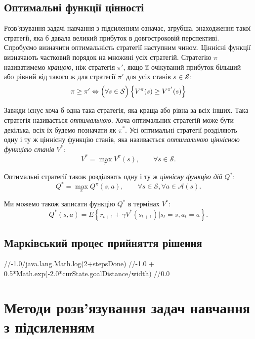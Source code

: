 \subsection{Оптимальні функції цінності}

Розв'язування задачі навчання з підсиленням означає, згрубша, знаходження такої стратегії, яка б давала великий прибуток в довгостроковій перспективі. Спробуємо визначити оптимальність стратегії наступним чином. Ціннісні функції визначають частковий порядок на множині усіх стратегій. Стратегію $\pi$ називатимемо \emph{кращою}, ніж стратегія $\pi '$, якщо її очікуваний прибуток більший або рівний від такого ж для стратегії $\pi '$ для усіх станів $s \in \mathcal{S}$:
\begin{equation}
\pi \geq \pi ' \Leftrightarrow \Bigl(\forall s \in \mathcal{S}\Bigr)\left\{ V^\pi(s) \geq V^{\pi '}(s) \right\}
\end{equation}

Завжди існує хоча б одна така стратегія, яка краща або рівна за всіх інших. Така стратегія називається \emph{оптимальною}. Хоча оптимальних стратегій може бути декілька, всіх їх будемо позначати як $\pi^*$. Усі оптимальні стратегії розділяють одну і ту ж ціннісну функцію станів, яка називається \emph{оптимальною ціннісною функцією станів} $V^*$:
\begin{equation}
V^* = \max_\pi V^\pi(s),\qquad \forall s \in \mathcal{S}.
\end{equation}

Оптимальні стратегії також розділяють одну і ту ж \emph{ціннісну функцію дій} $Q^*$:
\begin{equation}
Q^* = \max_\pi Q^\pi(s,a),\qquad \forall s \in \mathcal{S}, \forall a \in \mathcal{A}(s).
\end{equation}

Ми можемо також записати функцію $Q^*$ в термінах $V^*$:
\begin{equation}
Q^*(s,a) = E\left\{r_{t+1} + \gamma V^*(s_{t+1}) \Big| s_t=s, a_t=a \right\}.
\end{equation}

\subsection{Марківський процес прийняття рішення}
      //-1.0/java.lang.Math.log(2+stepsDone)
      //-1.0 + 0.5*Math.exp(-2.0*curState.goalDistance/width)
      //0.0

\section{Методи розв'язування задач навчання з підсиленням}

